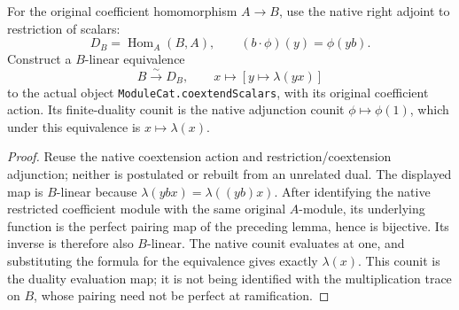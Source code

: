 \begin{theorem}
\label{thm:kn-nadel-root-coextension-dual}
\leanok
For the original coefficient homomorphism $A\to B$, use the native
right adjoint to restriction of scalars:
\[
 D_B=\operatorname{Hom}_A(B,A),\qquad
 (b\cdot\phi)(y)=\phi(yb).
\]
Construct a $B$-linear equivalence
\[
 B\xrightarrow{\sim}D_B,\qquad x\longmapsto[y\mapsto\lambda(yx)]
\]
to the actual object
\texttt{ModuleCat.coextendScalars}, with its original coefficient
action.  Its finite-duality counit is the native adjunction counit
$\phi\mapsto\phi(1)$, which under this equivalence is $x\mapsto\lambda(x)$.
\end{theorem}
\begin{proof}
Reuse the native coextension action and restriction/coextension
adjunction; neither is postulated or rebuilt from an unrelated dual.
The displayed map is $B$-linear because
$\lambda(ybx)=\lambda((yb)x)$.  After identifying the native
restricted coefficient module with the same original $A$-module,
its underlying function is the perfect pairing map of the preceding
lemma, hence is bijective.  Its inverse is therefore also $B$-linear.
The native counit evaluates at one, and substituting the formula
for the equivalence gives exactly $\lambda(x)$.  This counit is
the duality evaluation map; it is not being identified with the
multiplication trace on $B$, whose pairing need not be perfect
at ramification.
\end{proof}

